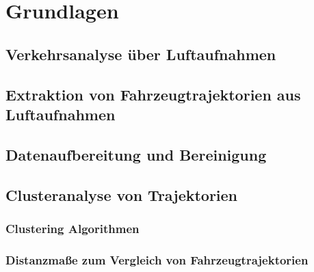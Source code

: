 
\chapter{Grundlagen}
\label{cha:grundlagen}

\section{Verkehrsanalyse über Luftaufnahmen}
\label{sec:traffic_analysis}

\section{Extraktion von Fahrzeugtrajektorien aus Luftaufnahmen}
\label{sec:position_extraction}

\section{Datenaufbereitung und Bereinigung}
\label{sec:tra_preprocessing}

\section{Clusteranalyse von Trajektorien}
\label{sec:tra_clustering}

\subsection{Clustering Algorithmen}
\label{sec:cluster_algos}

\subsection{Distanzmaße zum Vergleich von Fahrzeugtrajektorien}
\label{sec:distance_measures}

